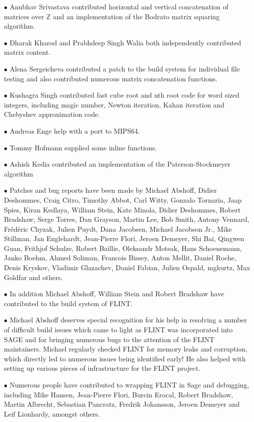 \documentclass[a4paper,10pt]{book}
\begin{document}
$\bullet$ Anubhav Srivastava contributed horizontal and vertical concatenation
of matrices over $\mathbb{Z}$ and an implementation of the Bodrato matrix
squaring algorithm.

$\bullet$ Dharak Kharod and Prabhdeep Singh Walia both independently
contributed matrix content.

$\bullet$ Alena Sergeicheva contributed a patch to the build system for
individual file testing and also contributed numerous matrix concatenation
functions.

$\bullet$ Kushagra Singh contributed fast cube root and nth root code for word
sized integers, including magic number, Newton iteration, Kahan iteration and
Chebyshev approximation code.

$\bullet$ Andreas Enge help with a port to MIPS64.

$\bullet$ Tommy Hofmann supplied some inline functions.

$\bullet$ Ashish Kedia contributed an implementation of the Paterson-Stockmeyer
algorithm

$\bullet$ Patches and bug reports have been made by Michael Abshoff,
Didier Deshommes, Craig Citro, Timothy Abbot, Carl Witty, Gonzalo Tornaria,
Jaap Spies, Kiran Kedlaya, William Stein, Kate Minola, Didier Deshommes, Robert
Bradshaw, Serge Torres, Dan Grayson, Martin Lee, Bob Smith, Antony Vennard,
Fr\'{e}d\'{e}ric Chyzak, Julien Puydt, Dana Jacobsen, Michael Jacobson Jr.,
Mike Stillman, Jan Englehardt, Jean-Pierre Flori, Jeroen Demeyer, Shi Bai,
Qingwen Guan, Frithjof Schulze, Robert Baillie, Oleksandr Motsak, Hans
Schoenemann, Janko Boehm, Ahmed Soliman, Francois Bissey, Anton Mellit, Daniel
Roche, Denis Kryskov, Vladimir Glazachev, Daniel Fabian, Julien Ospald, mgkurtz, Max Goldfar and others.

$\bullet$ In addition Michael Abshoff, William Stein and Robert Bradshaw have
contributed to the build system of FLINT.

$\bullet$ Michael Abshoff deserves special recognition for his help in
resolving a number of difficult build issues which came to light as FLINT was
incorporated into SAGE and for bringing numerous bugs to the attention of the
FLINT maintainers. Michael regularly checked FLINT for memory leaks and
corruption, which directly led to numerous issues being identified early!
He also helped with setting up various pieces of infrastructure for the FLINT
project.

$\bullet$ Numerous people have contributed to wrapping FLINT in Sage and
debugging, including Mike Hansen, Jean-Pierre Flori, Burcin Erocal, Robert
Bradshaw, Martin Albrecht, Sebastian Pancratz, Fredrik Johansson, Jeroen
Demeyer and Leif Lionhardy, amongst others.
\end{document}
